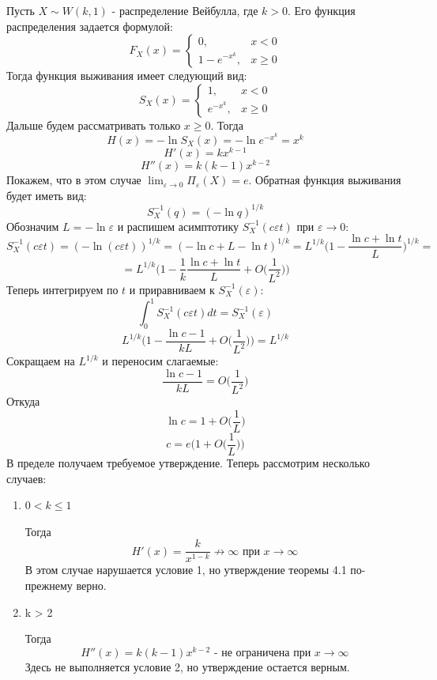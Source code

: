 \documentclass[12pt]{article}
\theoremstyle{plain}
\theoremstyle{definition}
\theoremstyle{remark}
\begin{document}
Пусть $X \sim W(k, 1)$ - распределение Вейбулла, где $k > 0$. Его функция распределения задается формулой:
\[
    F_X(x) = \begin{cases}
        0, & x < 0 \\
        1 - e^{-x^k}, & x \geq 0
    \end{cases}
\]
Тогда функция выживания имеет следующий вид:
\[
    S_X(x) = \begin{cases}
        1, & x < 0 \\
        e^{-x^k}, & x \geq 0
    \end{cases}
\]
Дальше будем рассматривать только $x\geq 0$. Тогда
\[
    H(x) = -\ln S_X(x) = -\ln e^{-x^k} = x^k
\]
\[
    H'(x) = kx^{k-1}
\]
\[
    H''(x) = k(k-1)x^{k-2}
\]
Покажем, что в этом случае $\lim_{\varepsilon \to 0}\Pi_\varepsilon(X) = e$. Обратная функция выживания будет иметь вид:
\[
    S_X^{-1}(q) = (-\ln q)^{1/k}
\]
Обозначим $L = -\ln\varepsilon$ и распишем асимптотику $S_X^{-1}(c\varepsilon t)$ при $\varepsilon \to 0$:
\[
    S_X^{-1}(c\varepsilon t) = (-\ln(c\varepsilon t))^{1/k} = (-\ln c + L - \ln t)^{1/k} = L^{1/k}\bigg(1-\frac{\ln c + \ln t}{L}\bigg)^{1/k} =
\]
\[
    = L^{1/k}\bigg(1 - \frac{1}{k}\frac{\ln c + \ln t}{L} + O\bigg(\frac{1}{L^2}\bigg)\bigg)
\]
Теперь интегрируем по $t$ и приравниваем к $S_X^{-1}(\varepsilon)$:
\[
    \int_0^1S_X^{-1}(c\varepsilon t)dt = S_X^{-1}(\varepsilon)
\]
\[
    L^{1/k}\bigg(1 - \frac{\ln c - 1}{kL} + O\bigg(\frac{1}{L^2}\bigg)\bigg) = L^{1/k}
\]
Сокращаем на $L^{1/k}$ и переносим слагаемые:
\[
    \frac{\ln c - 1}{kL} = O\bigg(\frac{1}{L^2}\bigg)
\]
Откуда 
\[ 
    \ln c = 1 + O\bigg(\frac{1}{L}\bigg)
\]
\[
    c = e\bigg(1 + O\bigg(\frac{1}{L}\bigg)\bigg)
\]
В пределе получаем требуемое утверждение. Теперь рассмотрим несколько случаев:
\begin{enumerate}
    \item $0 < k \leq 1$ 
    
    Тогда 
    \[
        H'(x) = \frac{k}{x^{1-k}} \not \to \infty \text{ при } x \to \infty 
    \]
    В этом случае нарушается условие 1, но утверждение теоремы 4.1 по-прежнему верно.
    \item k > 2

    Тогда 
    \[
        H''(x) = k(k-1)x^{k-2} \text{ - не ограничена при } x\to \infty
    \]
    Здесь не выполняется условие 2, но утверждение остается верным.
\end{enumerate}
\end{document}

